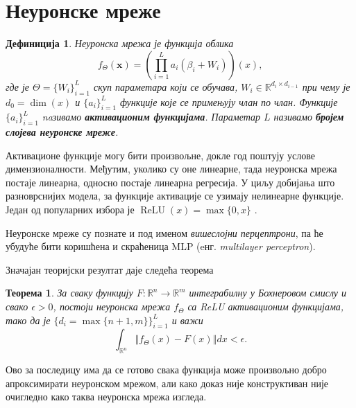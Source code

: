 \documentclass[12pt, a4paper, twoside]{book}
\numberwithin{equation}{chapter}
\newtheorem{theorem}{Теорема}
\numberwithin{theorem}{section}
\newtheorem{definition}{Дефиниција}
\numberwithin{definition}{section}
\numberwithin{definitionChapter}{chapter}
\begin{document}
\section{Неуронске мреже}
%
%

\begin{definition}
	Неуронска мрежа је функција облика
	$$f_{\Theta}(\mathbf{x}) = \left(\prod_{i=1}^{L}a_i(\beta_i + W_i)\right) (x),$$
	где је $\Theta = \{W_i\}_{i=1}^{L}$ скуп параметара који се обучава,
	$W_i \in \mathbb{R}^{d_i \times d_{i-1}}$ при чему је $d_0 = \dim(x)$ и
	$\{a_i\}_{i=1}^{L}$ функције које се примењују члан по члан. Функције
	$\{a_i\}_{i=1}^{L}$ naзивамо \textbf{активационим функцијама}.
	Параметар $L$ називамо \textbf{бројем слојева неуронске мреже}.
\end{definition}
Активационе функције могу бити произвољне, докле год поштују услове димензионалности. Међутим,
уколико су оне линеарне, тада неуронска мрежа постаје линеарна, односно постаје линеарна регресија.
У циљу добијања што разноврснијих модела, за функције активације се узимају нелинеарне функције.
Један од популарних избора је $\operatorname{ReLU}(x) = \max\{0, x\}$ \cite{relu}.

Неуронске мреже су познате и под именом \textit{вишеслојни перцептрони}, па ће убудуће бити
коришћена и скраћеница MLP (eнг. \textit{multilayer perceptron}).

Значајан теоријски резултат даје следећа теорема \cite{universal-approx}
\begin{theorem}
	За сваку функцију $F:\mathbb{R}^n \rightarrow \mathbb{R}^m$ интеграбилну у Бохнеровом смислу
	и свако $\epsilon > 0$, постоји неуронска мрежа $f_\Theta$ са ReLU активационим функцијама,
	тако да је $\{d_i=\max\{ n + 1, m\}\}_{i=1}^{L}$ и важи
	$$\int_{\mathbb{R}^n}\left\Vert f_\Theta(x) - F(x) \right\Vert dx < \epsilon.$$
\end{theorem}
Ово за последицу има да се готово свака функција може произвољно добро апроксимирати неуронском
мрежом, али како доказ није конструктиван није очигледно како таква неуронска мрежа изгледа.
\end{document}
